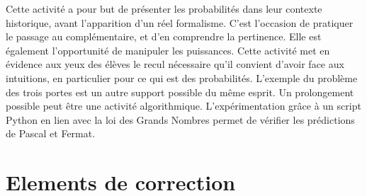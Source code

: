 \documentclass[frenchb]{article}
\begin{document}
Cette activité a pour but de présenter les probabilités dans leur contexte historique, avant l'apparition d'un réel formalisme. C'est l'occasion de pratiquer le passage au complémentaire, et d'en comprendre la pertinence. Elle est également l'opportunité de manipuler les puissances. Cette activité met en évidence aux yeux des élèves le recul nécessaire qu'il convient d'avoir face aux intuitions, en particulier pour ce qui est des probabilités. L'exemple du problème des trois portes est un autre support possible du même esprit. Un prolongement possible peut être une activité algorithmique. L'expérimentation grâce à un script Python en lien avec la loi des Grands Nombres permet de vérifier les prédictions de Pascal et Fermat.

\section*{Elements de correction}
\end{document}
